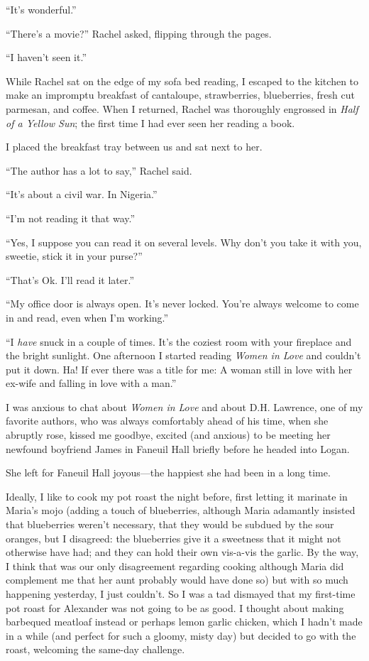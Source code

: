 ``It's wonderful.''

``There's a movie?'' Rachel asked, flipping through the pages.

``I haven't seen it.''

While Rachel sat on the edge of my sofa bed reading, I escaped to the
kitchen to make an impromptu breakfast of cantaloupe, strawberries,
blueberries, fresh cut parmesan, and coffee. When I returned, Rachel was
thoroughly engrossed in \emph{Half of a Yellow Sun}; the first time I
had ever seen her reading a book.

I placed the breakfast tray between us and sat next to her.

``The author has a lot to say,'' Rachel said.

``It's about a civil war. In Nigeria.''

``I'm not reading it that way.''

``Yes, I suppose you can read it on several levels. Why don't you take
it with you, sweetie, stick it in your purse?''

``That's Ok. I'll read it later.''

``My office door is always open. It's never locked. You're always
welcome to come in and read, even when I'm working.''

``I \emph{have} snuck in a couple of times. It's the coziest room with
your fireplace and the bright sunlight. One afternoon I started reading
\emph{Women in Love} and couldn't put it down. Ha! If ever there was a
title for me: A woman still in love with her ex-wife and falling in love
with a man.''

I was anxious to chat about \emph{Women in Love} and about D.H.
Lawrence, one of my favorite authors, who was always comfortably ahead
of his time, when she abruptly rose, kissed me goodbye, excited (and
anxious) to be meeting her newfound boyfriend James in Faneuil Hall
briefly before he headed into Logan.

She left for Faneuil Hall joyous---the happiest she had been in a long
time.

Ideally, I like to cook my pot roast the night before, first letting it
marinate in Maria's mojo (adding a touch of blueberries, although Maria
adamantly insisted that blueberries weren't necessary, that they would
be subdued by the sour oranges, but I disagreed: the blueberries give it
a sweetness that it might not otherwise have had; and they can hold
their own vis-a-vis the garlic. By the way, I think that was our only
disagreement regarding cooking although Maria did complement me that her
aunt probably would have done so) but with so much happening yesterday,
I just couldn't. So I was a tad dismayed that my first-time pot roast
for Alexander was not going to be as good. I thought about making
barbequed meatloaf instead or perhaps lemon garlic chicken, which I
hadn't made in a while (and perfect for such a gloomy, misty day) but
decided to go with the roast, welcoming the same-day challenge.

